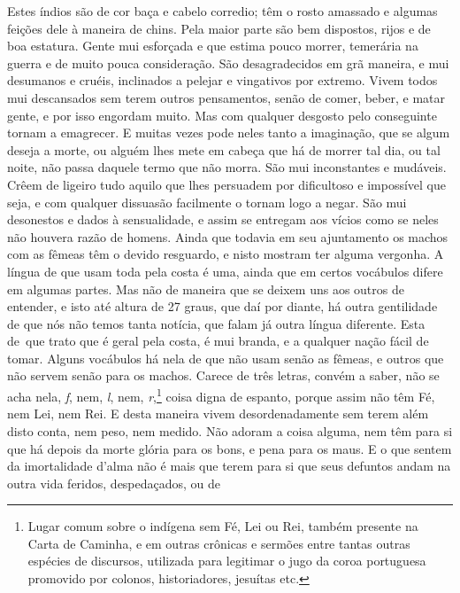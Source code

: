 Estes índios são de cor baça 								%
e cabelo corredio; têm o rosto amassado e
algumas feições dele à maneira de chins. Pela maior parte são bem
dispostos, rijos e de boa estatura. Gente mui esforçada e que estima
pouco morrer, temerária na guerra e de muito pouca consideração. São
desagradecidos em grã maneira, e mui desumanos e cruéis, inclinados a
pelejar e vingativos por extremo. Vivem todos mui descansados sem terem
outros pensamentos, senão de comer, beber, e matar gente, e por isso
engordam muito. Mas com qualquer desgosto pelo conseguinte tornam a
emagrecer.
E muitas vezes pode neles tanto a imaginação, que se algum
deseja a morte, ou alguém lhes mete em cabeça que há de morrer tal dia,
ou tal noite, não passa daquele termo que não morra. São mui
inconstantes e mudáveis. Crêem de ligeiro tudo aquilo que lhes persuadem
por dificultoso e impossível que seja, e com qualquer dissuasão
facilmente o tornam logo a negar. São mui desonestos e dados à
sensualidade, e assim se entregam aos vícios como se neles não houvera
razão de homens. Ainda que todavia em seu ajuntamento os machos com as
fêmeas têm o devido resguardo, e nisto mostram ter alguma vergonha.
A língua de que usam toda pela costa é uma, ainda que em certos			%
vocábulos difere em algumas partes. Mas não de maneira que se deixem uns
aos outros de entender, e isto até altura de 27 graus, que
daí por diante, há outra gentilidade de que nós não temos tanta
notícia, que falam já outra língua diferente. Esta \mbox{de que} trato que é
geral pela costa, é mui branda, e a qualquer nação fácil de tomar.
Alguns vocábulos há nela de que não usam senão as fêmeas, e outros que não servem
senão para os machos. Carece de três letras, convém a saber, não se		%
acha nela, \textit{f}, nem, \textit{l}, nem, \textit{r},\footnote{ Lugar comum sobre o indígena sem Fé, Lei
ou Rei, também presente na Carta de Caminha, e em outras crônicas e sermões entre
tantas outras espécies de discursos, utilizada para legitimar o jugo da coroa
portuguesa promovido por colonos, historiadores, jesuítas etc.} coisa digna de
espanto, porque assim não têm  \label{feleirei}%
Fé, nem Lei, nem Rei. E desta maneira vivem desordenadamente sem terem		%
além disto conta, nem peso, nem medido. Não adoram a coisa alguma, nem
têm para si que há depois da morte glória para os bons, e pena para os		%
maus. E o que sentem da imortalidade d'alma não é mais que terem para
si que seus defuntos andam na outra vida feridos, despedaçados, ou de
